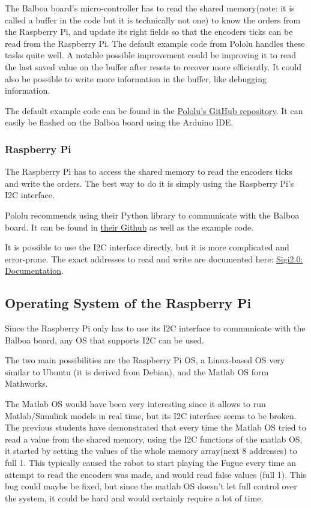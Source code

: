 \documentclass{article}
\begin{document}
The Balboa board's micro-controller has to read the shared memory(note: it is called a buffer in
the code but it is technically not one) to know the orders from the Raspberry Pi, and update its
right fields so that the encoders ticks can be read from the Raspberry Pi.
The default example code from Pololu handles these tasks quite well. A notable possible
improvement could be improving it to read the last saved value on the buffer after resets to
recover more efficiently. It could also be possible to write more information in the buffer, like
debugging information.

The default example code can be found in the
\href{https://github.com/pololu/pololu-rpi-slave-arduino-library/blob/master/examples/AStarRPiSlaveDemo/AStarRPiSlaveDemo.ino}
{Pololu's GitHub repository}.
It can easily be flashed on the Balboa board using the Arduino IDE.

\subsubsection{Raspberry Pi}

The Raspberry Pi has to access the shared memory to read the encoders ticks and write the orders.
The best way to do it is simply using the Raspberry Pi's I2C interface.

Pololu recommends using their Python library to communicate with the Balboa board. It can be found in
\href{https://github.com/pololu/pololu-rpi-slave-arduino-library/blob/master/pi/a_star.py}{their Github}
as well as the example code.

It is possible to use the I2C interface directly, but it is more complicated and error-prone.
The exact addresses to read and write are documented here: \href{file://other_doc/Sigi_documentation_part1.pdf}
{Sigi2.0: Documentation}.


\subsection{Operating System of the Raspberry Pi}

Since the Raspberry Pi only has to use its I2C interface to communicate with the Balboa board,
any OS that supports I2C can be used.

The two main possibilities are the Raspberry Pi OS, a Linux-based OS very similar to Ubuntu
(it is derived from Debian), and the Matlab OS form Mathworks.

The Matlab OS would have been very interesting since it allows to run Matlab/Simulink models
in real time, but its I2C interface seems to be broken. The previous students have demonstrated
that every time the Matlab OS tried to read a value from the shared memory, using the I2C
functions of the matlab OS, it started by setting the values of the whole memory array(next 8
addresses) to full 1. This typically caused the robot to start playing the Fugue every time an
attempt to read the encoders was made, and would read false values (full 1).
This bug could maybe be fixed, but since the matlab OS doesn't let full control over the system,
it could be hard and would certainly require a lot of time.
\end{document}
